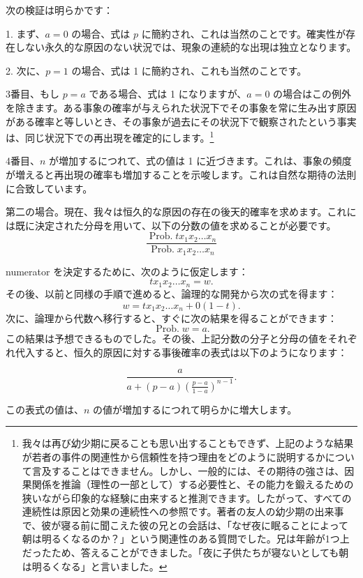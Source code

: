 \documentclass[a4paper,11pt,openany]{ltjsbook}
\begin{document}
次の検証は明らかです：

1. まず、$a = 0$ の場合、式は $p$ に簡約され、これは当然のことです。確実性が存在しない永久的な原因のない状況では、現象の連続的な出現は独立となります。

2. 次に、$p = 1$ の場合、式は 1 に簡約され、これも当然のことです。

3番目、もし \( p = a \) である場合、式は 1 になりますが、\( a = 0 \) の場合はこの例外を除きます。ある事象の確率が与えられた状況下でその事象を常に生み出す原因がある確率と等しいとき、その事象が過去にその状況下で観察されたという事実は、同じ状況下での再出現を確定的にします。\footnote{我々は再び幼少期に戻ることも思い出することもできず、上記のような結果が若者の事件の関連性から信頼性を持つ理由をどのように説明するかについて言及することはできません。しかし、一般的には、その期待の強さは、因果関係を推論（理性の一部として）する必要性と、その能力を鍛えるための狭いながら印象的な経験に由来すると推測できます。したがって、すべての連続性は原因と効果の連続性への参照です。著者の友人の幼少期の出来事で、彼が寝る前に聞こえた彼の兄との会話は、「なぜ夜に眠ることによって朝は明るくなるのか？」という関連性のある質問でした。兄は年齢が1つ上だったため、答えることができました。「夜に子供たちが寝ないとしても朝は明るくなる」と言いました。}%

4番目、\( n \) が増加するにつれて、式の値は 1 に近づきます。これは、事象の頻度が増えると再出現の確率も増加することを示唆します。これは自然な期待の法則に合致しています。

\textsc{第二の場合}。現在、我々は恒久的な原因の存在の後天的確率を求めます。これには既に決定された分母を用いて、以下の分数の値を求めることが必要です。
\[
  \frac{\operatorname{Prob. } t x_1 x_2 \dotsc x_n}
       {\operatorname{Prob. }   x_1 x_2 \dotsc x_n}
\]

numerator を決定するために、次のように仮定します：
\[
t x_1 x_2 \dotsc x_n = w.
\]
その後、以前と同様の手順で進めると、論理的な開発から次の式を得ます：
\[
w = t x_1 x_2 \dotsc x_n + 0 (1-t).
\]
次に、論理から代数へ移行すると、すぐに次の結果を得ることができます：
\[
\operatorname{Prob. } w = a.
\]
この結果は予想できるものでした。その後、上記分数の分子と分母の値をそれぞれ代入すると、恒久的原因に対する事後確率の表式は以下のようになります：

\begin{equation*}
\frac{a}{a+(p-a)\left(\frac{p-a}{1-a}\right)^{n-1}}.
\end{equation*}

この表式の値は、$n$ の値が増加するにつれて明らかに増大します。
\end{document}
